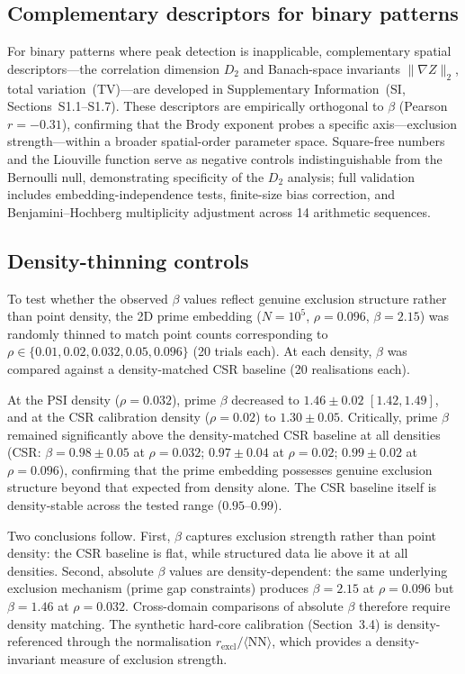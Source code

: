 \documentclass[final,3p,times,twocolumn]{elsarticle}
\theoremstyle{definition}
\begin{document}
\subsection{Complementary descriptors for binary patterns}

For binary patterns where peak detection is inapplicable,
complementary spatial descriptors---the correlation dimension $D_2$
and Banach-space invariants $\|\nabla Z\|_2$, total variation~(TV)---are
developed in Supplementary Information~(SI, Sections~S1.1--S1.7).
These descriptors are empirically orthogonal to $\beta$ (Pearson
$r=-0.31$), confirming that the Brody exponent probes a specific
axis---exclusion strength---within a broader spatial-order parameter
space. Square-free numbers and the Liouville function serve as negative
controls indistinguishable from the Bernoulli null, demonstrating
specificity of the $D_2$ analysis; full validation includes
embedding-independence tests, finite-size bias correction, and
Benjamini--Hochberg multiplicity adjustment across 14 arithmetic
sequences.

\subsection{Density-thinning controls}

To test whether the observed $\beta$ values reflect genuine exclusion
structure rather than point density, the 2D prime embedding
($N=10^5$, $\rho=0.096$, $\beta=2.15$) was randomly thinned to match
point counts corresponding to $\rho \in \{0.01, 0.02, 0.032, 0.05,
0.096\}$ (20 trials each). At each density, $\beta$ was compared
against a density-matched CSR baseline (20 realisations each).

At the PSI density ($\rho=0.032$), prime $\beta$ decreased to
$1.46\pm0.02$ $[1.42,1.49]$, and at the CSR calibration density
($\rho=0.02$) to $1.30\pm0.05$. Critically, prime $\beta$ remained
significantly above the density-matched CSR baseline at all densities
(CSR: $\beta=0.98\pm0.05$ at $\rho=0.032$; $0.97\pm0.04$ at
$\rho=0.02$; $0.99\pm0.02$ at $\rho=0.096$), confirming that the
prime embedding possesses genuine exclusion structure beyond that
expected from density alone. The CSR baseline itself is density-stable
across the tested range ($0.95$--$0.99$).

Two conclusions follow. First, $\beta$ captures exclusion strength
rather than point density: the CSR baseline is flat, while structured
data lie above it at all densities. Second, absolute $\beta$ values
are density-dependent: the same underlying exclusion mechanism (prime
gap constraints) produces $\beta=2.15$ at $\rho=0.096$ but
$\beta=1.46$ at $\rho=0.032$. Cross-domain comparisons of absolute
$\beta$ therefore require density matching. The synthetic hard-core
calibration (Section~3.4) is density-referenced through the
normalisation $r_{\text{excl}}/\langle\text{NN}\rangle$, which
provides a density-invariant measure of exclusion strength.
\end{document}
